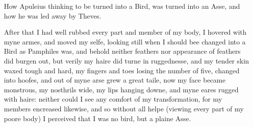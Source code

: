 
How Apuleius thinking to be turned into a Bird, was turned into an Asse, and
how he was led away by Theves.

After that I had well rubbed every part and member of my body, I hovered with
myne armes, and moved my selfe, looking still when I should bee changed into a
Bird as Pamphiles was, and behold neither feathers nor appearance of feathers
did burgen out, but verily my haire did turne in ruggednesse, and my tender
skin waxed tough and hard, my fingers and toes losing the number of five,
changed into hoofes, and out of myne arse grew a great taile, now my face
became monstrous, my nosthrils wide, my lips hanging downe, and myne eares
rugged with haire: neither could I see any comfort of my transformation, for my
members encreased likewise, and so without all helpe (viewing every part of my
poore body) I perceived that I was no bird, but a plaine Asse.

